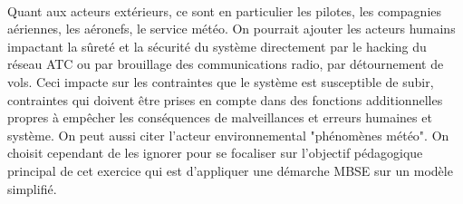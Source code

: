 \paragraph{}
Quant aux acteurs extérieurs, ce sont en particulier les pilotes, les compagnies aériennes, les aéronefs, le service météo. On pourrait ajouter les acteurs humains impactant la sûreté et la sécurité du système directement par le hacking du réseau ATC ou par brouillage des communications radio, par détournement de vols. Ceci impacte sur les contraintes que le système est susceptible de subir, contraintes qui doivent être prises en compte dans des fonctions additionnelles propres à empêcher les conséquences de malveillances et erreurs humaines et système. On peut aussi citer l'acteur environnemental "phénomènes météo". On choisit cependant de les ignorer pour se focaliser sur l'objectif pédagogique principal de cet exercice qui est d'appliquer une démarche MBSE sur un modèle simplifié.







